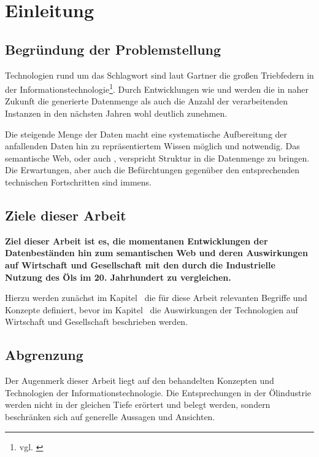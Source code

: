 \section{Einleitung}
\label{sec:einleitung}

\subsection{Begründung der Problemstellung}

Technologien rund um das Schlagwort  sind laut Gartner die großen Triebfedern in der Informationstechnologie\footnote{vgl. \cite{gartner2014}}. Durch Entwicklungen wie  und  werden die in naher Zukunft die generierte Datenmenge als auch die Anzahl der verarbeitenden Instanzen in den nächsten Jahren wohl deutlich zunehmen.

Die steigende Menge der Daten macht eine systematische Aufbereitung der anfallenden Daten hin zu repräsentiertem Wissen möglich und notwendig. Das semantische Web, oder auch , verspricht Struktur in die Datenmenge zu bringen. Die Erwartungen, aber auch die Befürchtungen gegenüber den entsprechenden technischen Fortschritten sind immens.

\subsection{Ziele dieser Arbeit}

\textbf{Ziel dieser Arbeit ist es, die momentanen Entwicklungen der Datenbeständen hin zum semantischen Web und deren Auswirkungen auf Wirtschaft und Gesellschaft mit den durch die Industrielle Nutzung des Öls im 20. Jahrhundert zu vergleichen.}

Hierzu werden zunächst im Kapitel~ die für diese Arbeit relevanten Begriffe und Konzepte definiert, bevor im Kapitel~ die Auswirkungen der Technologien auf Wirtschaft und Gesellschaft beschrieben werden.


\subsection{Abgrenzung}

Der Augenmerk dieser Arbeit liegt auf den behandelten Konzepten und Technologien der Informationstechnologie. Die Entsprechungen in der Ölindustrie werden nicht in der gleichen Tiefe erörtert und belegt werden, sondern beschränken sich auf generelle Aussagen und Ansichten.

